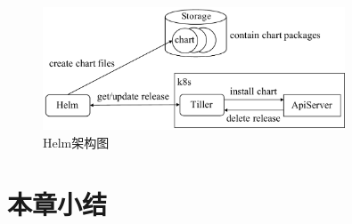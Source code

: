 \begin{figure}[h] %
    \centering %
    \includegraphics[width=0.8\textwidth]{FIGs/chapter2/helm.pdf} %
    \caption{Helm架构图} %
    \label{helm} %
\end{figure}%







\section{本章小结}

